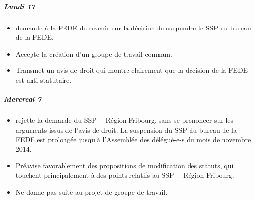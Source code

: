 \subparagraph{Lundi 17}%
\begin{itemize}
	\item demande à la FEDE de revenir sur la décision de suspendre le SSP du bureau de la FEDE.
	\item Accepte la création d'un groupe de travail commun.
	\item Transmet un avis de droit qui montre clairement que la décision de la FEDE est anti-statutaire.
\end{itemize}

\subparagraph{Mercredi 7}%
\begin{itemize}
	\item rejette la demande du SSP~– Région Fribourg, sans se prononcer sur les arguments issus de l'avis de droit.
		La suspension du SSP du bureau de la FEDE est prolongée jusqu'à l'Assemblée des délégué-e-s du mois de novembre 2014.
	\item Préavise favorablement des propositions de modification des statuts, qui touchent principalement à des points relatifs au SSP~– Région Fribourg.
	\item Ne donne pas suite au projet de groupe de travail.
\end{itemize}










